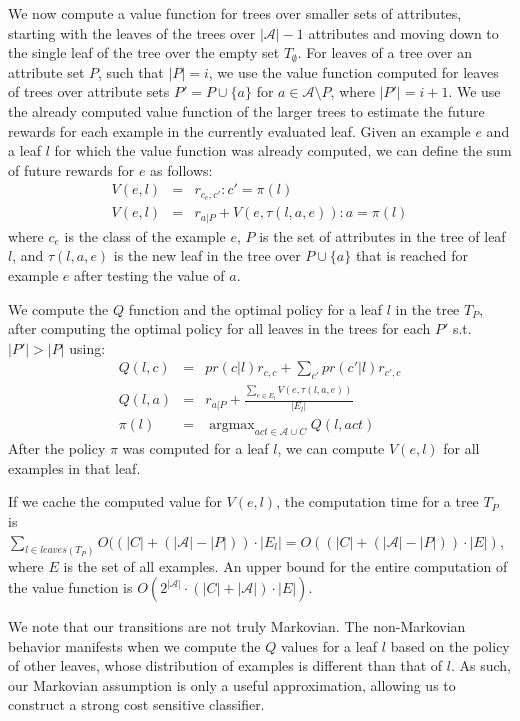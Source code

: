 \documentclass[letterpaper]{article}
\DeclareMathOperator*{\argmax}{argmax}
\theoremstyle{definition}
\begin{document}
We now compute a value function for trees over smaller sets of attributes, starting with the leaves of the trees over $|\mathcal{A}|-1$ attributes and moving down to the single leaf of the tree over the empty set $T_{\emptyset}$.
For leaves of a tree over an attribute set $P$, such that $|P|=i$, we use the value function computed for leaves of trees over attribute sets $P' = P \cup \{a\}$ for $a \in \mathcal{A}\setminus P$, where $|P'| = i+1$.
We use the already computed value function of the larger trees to estimate the future rewards for each example in the currently evaluated leaf. Given an example $e$ and a leaf $l$ for which the value function was already computed, we can define the sum of future rewards for $e$ as follows:
{\footnotesize
\begin{eqnarray}
\label{eqn:vel}
V(e,l) &=& r_{c_e,c'}  :  c' = \pi(l) \\
V(e,l) &=& r_{a|P} + V(e,\tau(l,a,e))  :  a = \pi(l)
\end{eqnarray}
}
where $c_e$ is the class of the example $e$, $P$ is the set of attributes in the tree of leaf $l$, and $\tau(l,a,e)$ is the new leaf in the tree over $P \cup \{a\}$ that is reached for example $e$ after testing the value of $a$.

We compute the $Q$ function and the optimal policy for a leaf $l$ in the tree $T_P$, after computing the optimal policy for all leaves in the trees for each $P'$ s.t. $|P'|>|P|$ using:
{\footnotesize
\begin{eqnarray}
Q(l,c) &=& pr(c|l)r_{c,c} + \sum_{c'}pr(c'|l)r_{c',c}\\
\label{eqn:qla}
Q(l,a) &=& r_{a|P} + \frac{\sum_{e \in E_l} V(e,\tau(l,a,e))}{|E_l|}\\
\label{eqn:pi}
\pi(l) &=& \argmax_{act \in \mathcal{A} \cup C} Q(l,act)
\end{eqnarray}
}
After the policy $\pi$ was computed for a leaf $l$, we can compute $V(e,l)$ for all examples in that leaf.




If we cache the computed value for $V(e,l)$, the computation time for a tree $T_P$ is $\sum_{l \in leaves(T_P)} O((|C| + (|\mathcal{A}| - |P|))\cdot |E_l| = O((|C| + (|\mathcal{A}| - |P|))\cdot |E|)$, where $E$ is the set of all examples. An  upper bound for the entire computation of the value function is $O(2^{|\mathcal{A}|} \cdot (|C| + |\mathcal{A}|)\cdot |E|)$.


We note that our transitions are not truly Markovian. The non-Markovian behavior manifests when we compute the $Q$ values for a leaf $l$ based on the policy of other leaves, whose distribution of examples is different than that of $l$. As such, our Markovian assumption is only a useful approximation, allowing us to construct a strong cost sensitive classifier.
\end{document}

